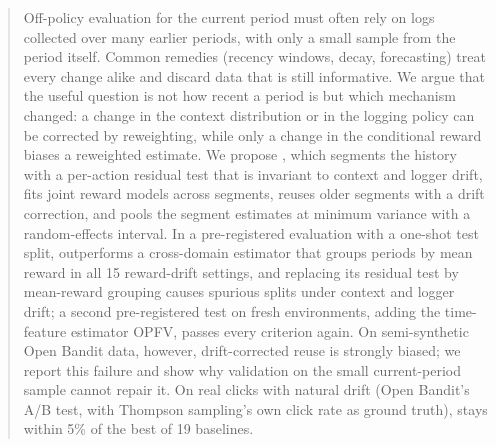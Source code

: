 \begin{abstract}
Off-policy evaluation for the current period must often rely on logs collected over many
earlier periods, with only a small sample from the period itself. Common remedies
(recency windows, decay, forecasting) treat every change alike and discard data that is
still informative. We argue that the useful question
is not how recent a period is but which mechanism changed: a change in the context
distribution or in the logging policy can be corrected by reweighting, while only a
change in the conditional reward biases a reweighted estimate. We propose \odrift{}, which
segments the history with a per-action residual test that is invariant to context and
logger drift, fits joint reward models across segments, reuses older segments with a
drift correction, and pools the segment estimates at minimum variance with a
random-effects interval. In a pre-registered evaluation with a one-shot test split, \odrift{}
outperforms a cross-domain estimator that groups periods by mean reward in all 15
reward-drift settings, and replacing its residual test by mean-reward grouping causes
spurious splits under context and logger drift; a second pre-registered test on fresh
environments, adding the time-feature estimator OPFV, passes every criterion again. On semi-synthetic Open Bandit data,
however, drift-corrected reuse is strongly biased; we report this failure and show
why validation on the small current-period sample cannot repair it. On real clicks with
natural drift (Open Bandit's A/B test, with Thompson sampling's own click rate as ground
truth), \odrift{} stays within 5\% of the best of 19 baselines.
\end{abstract}
